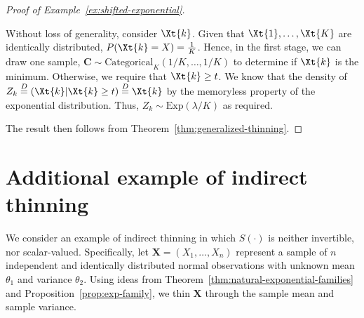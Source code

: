 \documentclass[12pt]{article}
\begin{document}
\begin{proof}[Proof of Example~\ref{ex:shifted-exponential}]
\begin{enumerate}
Without loss of generality, consider $\Xt{k}$. Given that $\Xt{1},\dots,\Xt{K}$ are identically distributed, $P(\Xt{k}=X)=\frac{1}{K}$. Hence, in the first stage, we can draw one sample, $\mathbf{C}\sim\text{Categorical}_K(1/K,\dots,1/K)$ to determine if $\Xt{k}$ is the minimum. Otherwise, we require that $ \Xt{k} \ge t$. We know that the density of $Z_k \overset{D}{=}(\Xt{k}|\Xt{k}\ge t) \overset{D}{=} \Xt{k}$ by the memoryless property of the exponential distribution. Thus, $Z_k \sim \text{Exp}\left(\lambda/K\right)$ as required.
    
\end{enumerate}
The result then follows from Theorem~\ref{thm:generalized-thinning}.

\end{proof}

\section{Additional example of indirect thinning}
\label{appendix:indirect}

We consider an example of indirect thinning in which $S(\cdot)$ is neither invertible, nor scalar-valued. Specifically, let $\mathbf{X}=(X_1,\ldots,X_n)$ represent a sample of $n$ independent and identically distributed normal observations with unknown mean $\theta_1$ and variance $\theta_2$. Using ideas from Theorem~\ref{thm:natural-exponential-families} and Proposition~\ref{prop:exp-family}, we thin $\mathbf{X}$ through the sample mean and sample variance. 
\end{document}
